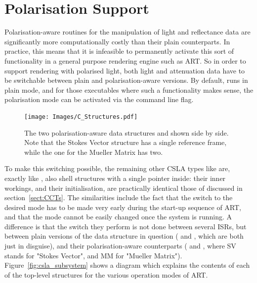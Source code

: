 \section{Polarisation Support}

Polarisation-aware routines for the manipulation of light and reflectance data are significantly more computationally costly than their plain counterparts. In practice, this means that it is infeasible to permanently activate this sort of functionality in a general purpose rendering engine such as ART. So in order to support rendering with polarised light, both light and attenuation data have to be switchable between plain and polarisation-aware versions. By default,  runs in plain mode, and for those executables where such a functionality makes sense, the polarisation mode can be activated via the  command line flag.

\begin{figure}[htbp]
\begin{center}
\texttt{[image: Images/C\_Structures.pdf]} 
\end{center}
\caption{
\label{fig:c_structs} 
The two polarisation-aware data structures  and  shown side by side. Note that the Stokes Vector structure has a single reference frame, while the one for the Mueller Matrix has two.
}
\end{figure}

To make this switching possible, the remaining other CSLA types like  \ea are, exactly like , also shell structures with a single  pointer inside: their inner workings, and their initialisation, are practically identical those of  discussed in section~\ref{sect:CCTs}. The similarities include the fact that the switch to the desired mode has to be made very early during the start-up sequence of ART, and that the mode cannot be easily changed once the system is running. A difference is that the switch they perform is not done between several ISRs, but between plain versions of the data structure in question ( and , which are both just  in disguise), and their polarisation-aware counterparts ( and , where SV stands for "Stokes Vector", and MM for "Mueller Matrix"). Figure~\ref{fig:csla_subsystem} shows a diagram which explains the contents of each of the top-level structures for the various operation modes of ART.

